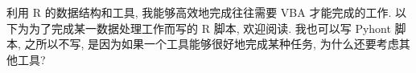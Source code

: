 利用 R 的数据结构和工具, 我能够高效地完成往往需要 VBA 才能完成的工作. 以下为为了完成某一数据处理工作而写的 R 脚本, 欢迎阅读. 我也可以写 Pyhont 脚本, 之所以不写, 是因为如果一个工具能够很好地完成某种任务, 为什么还要考虑其他工具? 
